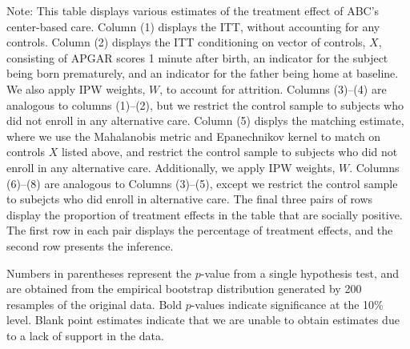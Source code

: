 \begin{table}[H]
\begin{threeparttable}
\begin{tabular}{cccccccccc}
  \hline\hline
  \end{tabular}
    \begin{tablenotes}
    \scriptsize
    \item 
Note: This table displays various estimates of the treatment effect of ABC's center-based care.
Column (1) displays the ITT, without accounting for any controls.
Column (2) displays the ITT conditioning on vector of controls, $X$, consisting of APGAR scores 1 
minute after birth, an indicator for the subject being born prematurely, and an indicator for the 
father being home at baseline. We also apply IPW weights, $W$, to account for attrition.
Columns (3)--(4) are analogous to columns (1)--(2), but we restrict the control sample to subjects
who did not enroll in any alternative care.
Column (5) displys the matching estimate, where we use the Mahalanobis metric and Epanechnikov kernel
to match on controls $X$ listed above, and restrict the control sample to subjects who did not enroll
in any alternative care. Additionally, we apply IPW weights, $W$.
Columns (6)--(8) are analogous to Columns (3)--(5), except we restrict the control sample to subejcts
who did enroll in alternative care. 
The final three pairs of rows display the proportion of treatment effects in the table that are 
socially positive. The first row in each pair displays the percentage of treatment effects, and the
second row presents the inference.

Numbers in parentheses represent the $p$-value from a single hypothesis test, and are obtained from 
the empirical bootstrap distribution generated by 200 resamples of the original data. 
Bold $p$-values indicate significance at the 10\% level.
Blank point estimates indicate that we are unable to obtain estimates due to a lack of support in the data. 

    \end{tablenotes}
  \end{threeparttable}

\end{table}